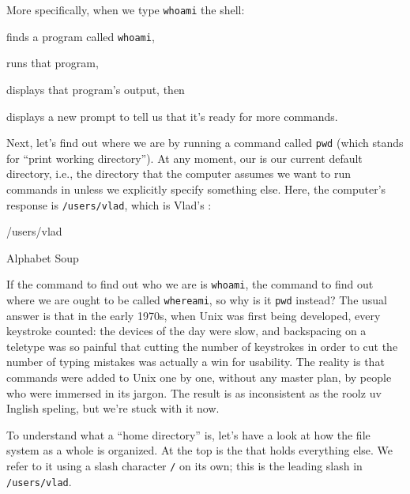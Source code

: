 More specifically, when we type \texttt{whoami} the shell:

\begin{swcenumerate}
\item
  finds a program called \texttt{whoami},
\item
  runs that program,
\item
  displays that program's output, then
\item
  displays a new prompt to tell us that it's ready for more commands.
\end{swcenumerate}

Next, let's find out where we are by running a command called
\texttt{pwd} (which stands for ``print working directory''). At any
moment, our  is our current default directory, i.e., the directory that
the computer assumes we want to run commands in unless we explicitly
specify something else. Here, the computer's response is
\texttt{/users/vlad}, which is Vlad's :


\begin{VerbOut}
/users/vlad
\end{VerbOut}

\begin{swcbox}{Alphabet Soup}

If the command to find out who we are is \texttt{whoami}, the command to
find out where we are ought to be called \texttt{whereami}, so why is it
\texttt{pwd} instead? The usual answer is that in the early 1970s, when
Unix was first being developed, every keystroke counted: the devices of
the day were slow, and backspacing on a teletype was so painful that
cutting the number of keystrokes in order to cut the number of typing
mistakes was actually a win for usability. The reality is that commands
were added to Unix one by one, without any master plan, by people who
were immersed in its jargon. The result is as inconsistent as the roolz
uv Inglish speling, but we're stuck with it now.

\end{swcbox}

To understand what a ``home directory'' is, let's have a look at how the
file system as a whole is organized. At the top is the
 that holds everything else.
We refer to it using a slash character \texttt{/} on its own; this is
the leading slash in \texttt{/users/vlad}.

